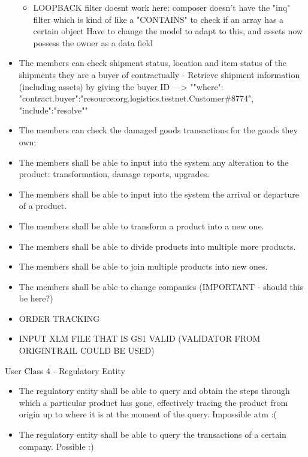 \begin{itemize}
\begin{itemize}
				 \item LOOPBACK filter doesnt work here: composer doesn't have the "inq" filter which is kind of like a "CONTAINS" to check if an array has a certain object
                 Have to change the model to adapt to this, and assets now possess the owner as a data field
            \end{itemize}
			\item The members can check shipment status, location and item status of the shipments they are a buyer of contractually - Retrieve shipment information (including assets) by giving the buyer ID --->  "{"where": {"contract.buyer":"resource:org.logistics.testnet.Customer\#8774"}, "include":"resolve"}"  
			\item The members can check the damaged goods transactions for the goods they own;
			\item The members shall be able to input into the system any alteration to the product: transformation, damage reports, upgrades.
			\item The members shall be able to input into the system the arrival or departure of a product.
			\item The members shall be able to transform a product into a new one.
			\item The members shall be able to divide products into multiple more products.
			\item The members shall be able to join multiple products into new ones.
			\item The members shall be able to change companies (IMPORTANT - should this be here?)
			\item ORDER TRACKING
			\item INPUT XLM FILE THAT IS GS1 VALID (VALIDATOR FROM ORIGINTRAIL COULD BE USED)
        \end{itemize}

        \par User Class 4 - Regulatory Entity
        \begin{itemize}
			\item The regulatory entity shall be able to query and obtain the steps through which a particular product has gone, effectively tracing the product from origin up to where it is at the moment of the query.  Impossible atm :(
			\item  The regulatory entity shall be able to query the transactions of a certain company. Possible :)
        \end{itemize}
		
